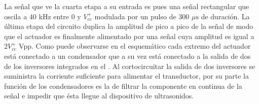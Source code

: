 La señal que ve la cuarta etapa a su entrada es pues una señal rectangular
que oscila a 40 kHz entre 0 y $V^+_{cc}$ modulada por un pulso de 300
$\mu\text{s}$ de duración. La última etapa del circuito duplica la amplitud
de pico a pico de la señal de modo que el actuador es finalmente alimentado
por una señal cuya amplitud es igual a $2 V^+_{cc}$ Vpp. Como puede
observarse en el esquemático cada extremo del actuador está conectado a un
condensador que a su vez está conectado a la salida de dos de los
inversores integrados en el . Al cortocircuitar la salida de
dos inversores se suministra la corriente suficiente para alimentar el
transductor, por su parte la función de los condensadores es la de filtrar
la componente en continua de la señal e impedir que ésta llegue al
dispositivo de ultrasonidos.
